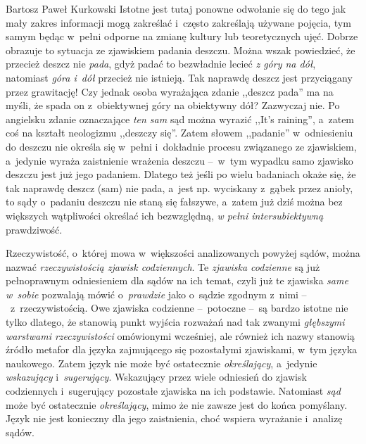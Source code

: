 \begin{artplenv}{Bartosz Paweł Kurkowski}
Istotne jest tutaj ponowne odwołanie się do tego jak mały zakres informacji mogą zakreślać i~często zakreślają używane
pojęcia, tym samym będąc w~pełni odporne na zmianę kultury lub teoretycznych ujęć. Dobrze obrazuje to sytuacja ze
zjawiskiem padania deszczu. Można wszak powiedzieć, że przecież deszcz nie \textit{pada}, gdyż padać to bezwładnie
lecieć \textit{z góry na dół}, natomiast \textit{góra i~dół }przecież nie istnieją. Tak naprawdę deszcz jest
przyciągany przez grawitację! Czy jednak osoba wyrażająca zdanie ,,deszcz pada'' ma na myśli, że spada on z~obiektywnej
góry na obiektywny dół? Zazwyczaj nie. Po angielsku zdanie oznaczające \textit{ten sam }sąd można wyrazić ,,It’s
raining'', a~zatem coś na kształt neologizmu ,,deszczy się''. Zatem słowem ,,padanie'' w~odniesieniu do deszczu nie określa
się w~pełni i~dokładnie procesu związanego ze zjawiskiem, a~jedynie wyraża zaistnienie wrażenia deszczu --~w~tym wypadku
samo zjawisko deszczu jest już jego padaniem. Dlatego też jeśli po wielu badaniach okaże się, że tak naprawdę deszcz
(sam) nie pada, a~jest np. wyciskany z~gąbek przez anioły, to sądy o~padaniu deszczu nie staną się fałszywe, a~zatem
już dziś można bez większych wątpliwości określać ich bezwzględną, \textit{w pełni intersubiektywną} prawdziwość.


Rzeczywistość, o~której mowa w~większości analizowanych powyżej sądów, można nazwać \textit{rzeczywistością zjawisk
codziennych}. Te \textit{zjawiska codzienne} są już pełnoprawnym odniesieniem dla sądów na ich temat, czyli już te
zjawiska \textit{same w~sobie} pozwalają mówić o~\textit{prawdzie} jako o~sądzie zgodnym z~nimi --~z~rzeczywistością.
Owe zjawiska codzienne --~potoczne --~są bardzo istotne nie tylko dlatego, że stanowią punkt wyjścia rozważań nad tak
zwanymi \textit{głębszymi warstwami rzeczywistości} omówionymi wcześniej, ale również ich nazwy stanowią źródło metafor
dla języka zajmującego się pozostałymi zjawiskami, w~tym języka naukowego. Zatem język nie może być ostatecznie
\textit{określający}, a~jedynie \textit{wskazujący }i~\textit{sugerujący}. Wskazujący przez wiele odniesień do zjawisk
codziennych i~sugerujący pozostałe zjawiska na ich podstawie. Natomiast \textit{sąd} może być ostatecznie
\textit{określający}, mimo że nie zawsze jest do końca pomyślany. Język nie jest konieczny dla jego zaistnienia, choć
wspiera wyrażanie i~analizę sądów.



\end{artplenv}
